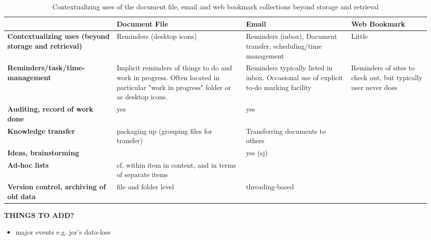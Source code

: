 \begin{table}[h]
\begin{center}
\begin{footnotesize}
\begin{tabular}{|p{2.5cm}|p{3.5cm}|p{3.5cm}|p{3.5cm}|}
\hline
    {\bf } & {\bf Document File} & {\bf Email} & {\bf Web Bookmark} \\
\hline \hline
{\bf Contextualizing uses (beyond storage and retrieval)} & Reminders (desktop icons) & Reminders (inbox), Document transfer, scheduling/time management &     Little \\
\hline
{\bf Reminders/task/time-management} & Implicit reminders of things to do and work in progress. Often located in particular "work in progress" folder or as desktop icons. & Reminders typically listed in inbox. Occasional use of explicit to-do marking facility & Reminders of sites to check out, but typically user never does \\
\hline
{\bf Auditing, record of work done} &        yes &        yes &            \\
\hline
{\bf Knowledge transfer} & packaging up  (grouping files for transfer) & Transferring documents to others &            \\
\hline
{\bf Ideas, brainstorming} &            &   yes (sj) &            \\
\hline
{\bf Ad-hoc lists} & cf. within item in content, and in terms of separate items &            &            \\
\hline
{\bf Version control, archiving of old data} & file and folder level & threading-based &            \\
\hline
\end{tabular}  
\end{footnotesize}
\caption{Contextualizing uses of the document file, email and web bookmark collections beyond storage and retrieval}
\label{table:chapter3_usage_strategy}
\end{center}
\end{table}

\noindent
\textbf{THINGS TO ADD?}
\begin{itemize}
	\item major events e.g. jor's data-loss
\end{itemize}
